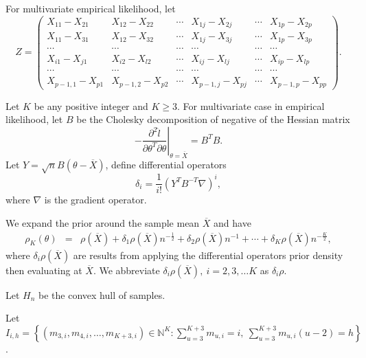 \documentclass[oneside,english]{amsbook}
\numberwithin{section}{chapter}
\numberwithin{equation}{section}
\numberwithin{figure}{section}
\theoremstyle{plain}
\theoremstyle{plain}
\theoremstyle{definition}
\theoremstyle{plain}
\theoremstyle{plain}
\theoremstyle{remark}
\theoremstyle{definition}
\theoremstyle{definition}
\begin{document}
For multivariate empirical likelihood, let 
\[
Z=\left(\begin{array}{cccccc}
X_{11}-X_{21} & X_{12}-X_{22} & \cdots & X_{1j}-X_{2j} & \cdots & X_{1p}-X_{2p}\\
X_{11}-X_{31} & X_{12}-X_{32} & \cdots & X_{1j}-X_{3j} & \cdots & X_{1p}-X_{3p}\\
\cdots & \cdots & \cdots & \cdots & \cdots & \cdots\\
X_{i1}-X_{j1} & X_{i2}-X_{l2} & \cdots & X_{ij}-X_{lj} & \cdots & X_{ip}-X_{lp}\\
\cdots & \cdots & \cdots & \cdots & \cdots & \cdots\\
X_{p-1,1}-X_{p1} & X_{p-1,2}-X_{p2} & \cdots & X_{p-1,j}-X_{pj} & \cdots & X_{p-1,p}-X_{pp}
\end{array}\right).
\]


Let $K$ be any positive integer and $K\ge3$. For multivariate case
in empirical likelihood, let $B$ be the Cholesky decomposition of
negative of the Hessian matrix 
\[
-\left.\frac{\partial^{2}\hat{l}}{\partial\theta^{T}\partial\theta}\right|_{\theta=\overline{X}}=B^{T}B.
\]
Let $Y=\sqrt{n}B\left(\theta-\overline{X}\right)$, define differential
operators 
\[
\delta_{i}=\frac{1}{i!}\left(Y^{T}B^{-T}\nabla\right)^{i},
\]
where $\nabla$ is the gradient operator. 

We expand the prior around the sample mean $\overline{X}$ and have
\begin{eqnarray*}
\rho_{K}\left(\theta\right) & = & \rho\left(\overline{X}\right)+\delta_{1}\rho\left(\overline{X}\right)n^{-\frac{1}{2}}+\delta_{2}\rho\left(\overline{X}\right)n^{-1}+\cdots+\delta_{K}\rho\left(\overline{X}\right)n^{-\frac{K}{2}},
\end{eqnarray*}
where $\delta_{i}\rho\left(\overline{X}\right)$ are results from
applying the differential operators prior density then evaluating
at $\overline{X}$. We abbreviate $\delta_{i}\rho\left(\overline{X}\right),\: i=2,3,\ldots K$
as $\delta_{i}\rho$.

Let $H_{n}$ be the convex hull of samples. 

Let $I_{i,h}=\left\{ \left(m_{3,i},m_{4,i},\ldots,m_{K+3,i}\right)\in\mathbb{N}^{K}:\sum_{u=3}^{K+3}m_{u,i}=i,\:\sum_{u=3}^{K+3}m_{u,i}\left(u-2\right)=h\right\} $.
\end{document}
